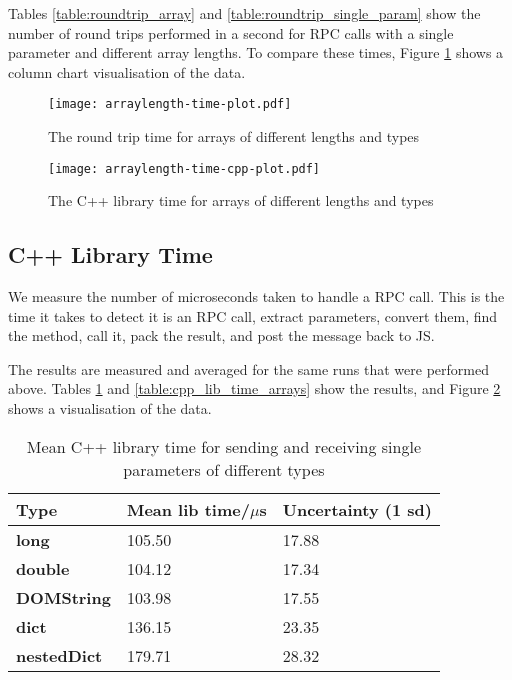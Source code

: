 Tables \ref{table:roundtrip_array} and \ref{table:roundtrip_single_param} show the number of round trips performed in a second for RPC calls with a single parameter and different array lengths. To compare these times, Figure \ref{fig:arraylength-time-plot} shows a column chart visualisation of the data.

\begin{figure}
    \centering
    \texttt{[image: arraylength-time-plot.pdf]} 
    \caption{The round trip time for arrays of different lengths and types}
    \label{fig:arraylength-time-plot}
\end{figure}


\begin{figure}
    \centering
    \texttt{[image: arraylength-time-cpp-plot.pdf]} 
    \caption{The C++ library time for arrays of different lengths and types}
    \label{fig:arraylength-time-cpp-plot}
\end{figure}



\subsection{C++ Library Time}\label{c-library-time}

We measure the number of microseconds taken to handle a RPC call. This is
the time it takes to detect it is an RPC call, extract parameters,
convert them, find the method, call it, pack the result, and post the
message back to JS.

The results are measured and averaged for the same runs that were
performed above. Tables \ref{table:cpp_lib_time_single_param} and \ref{table:cpp_lib_time_arrays} show the results, and Figure \ref{fig:arraylength-time-cpp-plot} shows a visualisation of the data.


\begin{table}[h]
\begin{tabular}{l|ll}
\textbf{Type}       & \textbf{Mean lib time/$\mu$s} & \textbf{Uncertainty (1 sd)} \\ \hline
\textbf{long}       & 105.50                    & 17.88                       \\
\textbf{double}     & 104.12                    & 17.34                       \\
\textbf{DOMString}  & 103.98                    & 17.55                       \\
\textbf{dict}       & 136.15                    & 23.35                       \\
\textbf{nestedDict} & 179.71                    & 28.32                      
\end{tabular}
\caption{Mean C++ library time for sending and receiving single parameters of different types}
\label{table:cpp_lib_time_single_param}
\end{table}


